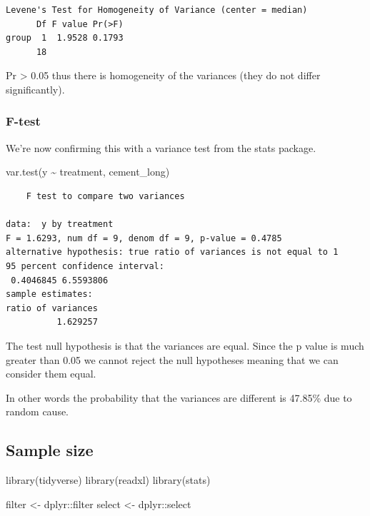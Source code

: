\documentclass[
]{book}
\newenvironment{Shaded}{\begin{snugshade}}{\end{snugshade}}
\newcommand{\FunctionTok}[1]{\textcolor[rgb]{0.00,0.00,0.00}{#1}}
\newcommand{\NormalTok}[1]{#1}
\newcommand{\OtherTok}[1]{\textcolor[rgb]{0.56,0.35,0.01}{#1}}
\newcommand{\SpecialCharTok}[1]{\textcolor[rgb]{0.00,0.00,0.00}{#1}}
\begin{document}
\begin{verbatim}
Levene's Test for Homogeneity of Variance (center = median)
      Df F value Pr(>F)
group  1  1.9528 0.1793
      18               
\end{verbatim}

Pr \textgreater{} 0.05 thus there is homogeneity of the variances (they do not differ significantly).

\hypertarget{FTest}{%
\subsubsection{F-test}\label{FTest}}

We're now confirming this with a variance test from the stats package.

\begin{Shaded}
\begin{Highlighting}[]
\FunctionTok{var.test}\NormalTok{(y }\SpecialCharTok{\textasciitilde{}}\NormalTok{ treatment, cement\_long)}
\end{Highlighting}
\end{Shaded}

\begin{verbatim}
	F test to compare two variances

data:  y by treatment
F = 1.6293, num df = 9, denom df = 9, p-value = 0.4785
alternative hypothesis: true ratio of variances is not equal to 1
95 percent confidence interval:
 0.4046845 6.5593806
sample estimates:
ratio of variances 
          1.629257 
\end{verbatim}

The test null hypothesis is that the variances are equal. Since the p value is much greater than 0.05 we cannot reject the null hypotheses meaning that we can consider them equal.

In other words the probability that the variances are different is 47.85\% due to random cause.

\hypertarget{sample-size}{%
\subsection{Sample size}\label{sample-size}}

\begin{Shaded}
\begin{Highlighting}[]
\FunctionTok{library}\NormalTok{(tidyverse)}
\FunctionTok{library}\NormalTok{(readxl)}
\FunctionTok{library}\NormalTok{(stats)}

\NormalTok{filter }\OtherTok{\textless{}{-}}\NormalTok{ dplyr}\SpecialCharTok{::}\NormalTok{filter}
\NormalTok{select }\OtherTok{\textless{}{-}}\NormalTok{ dplyr}\SpecialCharTok{::}\NormalTok{select}
\end{Highlighting}
\end{Shaded}
\end{document}
